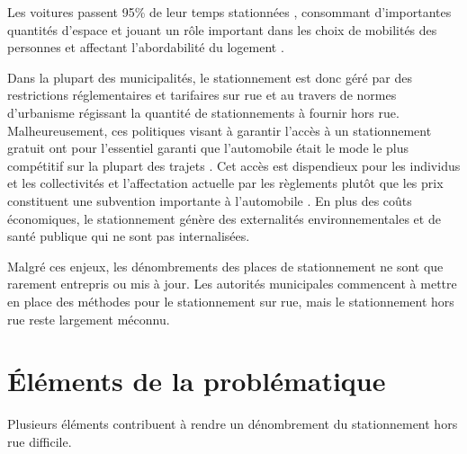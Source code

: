 
\label{sec:Introduction}  %

Les voitures passent 95\% de leur temps stationnées \parencite{morency_identification_2015}, consommant d'importantes quantités d'espace et jouant un rôle important dans les choix de mobilités des personnes \parencite{christiansen_parking_2017} et affectant l'abordabilité du logement \parencite{shah_impact_2024}. \par

Dans la plupart des municipalités, le stationnement est donc géré par des restrictions réglementaires et tarifaires sur rue et au travers de normes d'urbanisme régissant la quantité de stationnements à fournir  hors rue\parencite{shoup_high_2005}. Malheureusement, ces politiques visant à garantir l'accès à un stationnement gratuit ont pour l'essentiel garanti que l'automobile était le mode le plus compétitif sur la plupart des trajets \parencite{weinberger_residential_2009,shoup_high_2005}. Cet accès est dispendieux pour les individus et les collectivités et l'affectation actuelle par les règlements plutôt que les prix constituent une subvention importante à l'automobile \parencite{inci_review_2015,shoup_high_2005,litman_parking_2023-1}. En plus des coûts économiques, le stationnement génère des externalités environnementales et de santé publique qui ne sont pas internalisées.\parencite{yuan_unraveling_2024,buyantuyev_urban_2010} \par

Malgré ces enjeux, les dénombrements des places de stationnement \parencite{shoup_high_2005,morency_stationnement_2017} ne sont que rarement entrepris ou mis à jour. Les autorités municipales commencent à mettre en place des méthodes pour le stationnement sur rue, \parencite{eros_curblr_2025,open_mobility_foundation_curb_2024-1} mais le stationnement hors rue reste largement méconnu.

\section{Éléments de la problématique}\label{sec:Problematique}  %
Plusieurs éléments contribuent à rendre un dénombrement du stationnement hors rue difficile.
 
